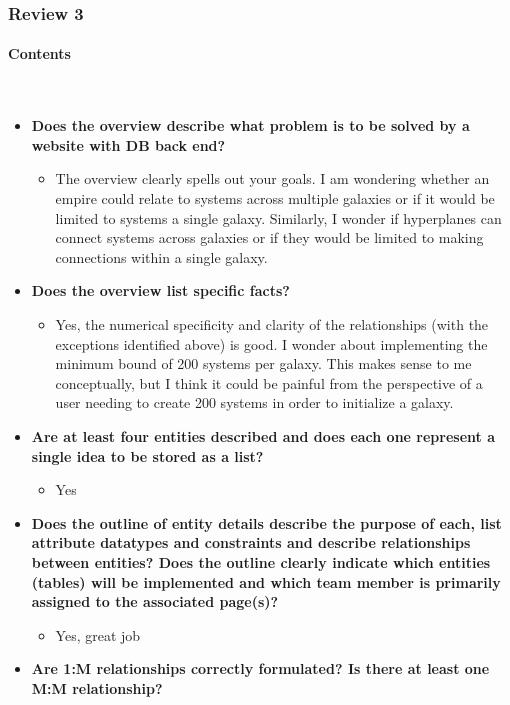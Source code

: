 \documentclass[12pt]{article}
\newcommand{\hiparagraph}[1]{\paragraph{#1}\mbox{}\vspace{-2em}\\}
\begin{document}
\begin{appendices}
\subsubsection{Review 3}
\hiparagraph{Contents}
\begin{itemize}
    \item \textbf{Does the overview describe what problem is to be solved by a website with DB back end?}
    \begin{itemize}
        \item The overview clearly spells out your goals. I am wondering whether an empire could relate to systems across multiple galaxies or if it would be limited to systems a single galaxy. Similarly, I wonder if hyperplanes can connect systems across galaxies or if they would be limited to making connections within a single galaxy.
    \end{itemize}
    \item \textbf{Does the overview list specific facts?}
    \begin{itemize}
        \item Yes, the numerical specificity and clarity of the relationships (with the exceptions identified above) is good. I wonder about implementing the minimum bound of 200 systems per galaxy. This makes sense to me conceptually, but I think it could be painful from the perspective of a user needing to create 200 systems in order to initialize a galaxy.
    \end{itemize}
    \item \textbf{Are at least four entities described and does each one represent a single idea to be stored as a list?}
    \begin{itemize}
        \item Yes
    \end{itemize}
    \item \textbf{Does the outline of entity details describe the purpose of each, list attribute datatypes and constraints and describe relationships between entities?  Does the outline clearly indicate which entities (tables) will be implemented and which team member is primarily assigned to the associated page(s)?}
    \begin{itemize}
        \item Yes, great job
    \end{itemize}
    \item \textbf{Are 1:M relationships correctly formulated? Is there at least  one M:M relationship?}
    \begin{itemize}

\end{itemize}
\end{itemize}
\end{appendices}
\end{document}
